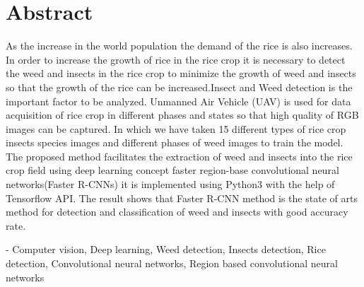 \chapter*{Abstract}
\bigskip
\begin{onehalfspace}

As the increase in the world population the demand of the rice is also increases. In order to increase the growth of rice in the rice crop it is necessary to detect the weed and insects in the rice crop to minimize the growth of weed and insects so that the growth of the rice can be increased.Insect and Weed detection is the important factor to be analyzed. Unmanned Air Vehicle (UAV) is used for data acquisition of rice crop in different phases and states so that high quality of RGB images can be captured. In which we have taken 15 different types of rice crop insects species images and different phases of weed images to train the model. The proposed method facilitates the extraction of weed and insects into the rice crop field using deep learning concept faster region-base convolutional neural networks(Faster R-CNNs) it is implemented using Python3 with the help of Tensorflow API. The result shows that Faster R-CNN method is the state of arts method for detection and classification of weed and insects with good accuracy rate.  

\end{onehalfspace}




\bigskip

 - { Computer vision, Deep learning, Weed detection, Insects detection, Rice detection, Convolutional neural networks, Region based convolutional neural networks}



